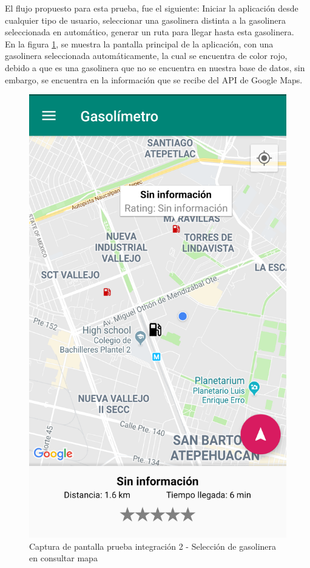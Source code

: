 El flujo propuesto para esta prueba, fue el siguiente: Iniciar la aplicación desde cualquier tipo de usuario, seleccionar una gasolinera distinta a la gasolinera seleccionada en automático, generar un ruta para llegar hasta esta gasolinera.\\

En la figura \ref{fig:int11}, se muestra la pantalla principal de la aplicación, con una gasolinera seleccionada automáticamente, la cual se encuentra de color rojo, debido a que es una gasolinera que no se encuentra en nuestra base de datos, sin embargo, se encuentra en la información que se recibe del API de Google Maps.

\begin{figure}[H]
	\centering
	\includegraphics[scale=.2]{Capitulo6/integracion/software/images/11}
	\caption{Captura de pantalla prueba integración 2 - Selección de gasolinera en consultar mapa}
	\label{fig:int11}
\end{figure}

